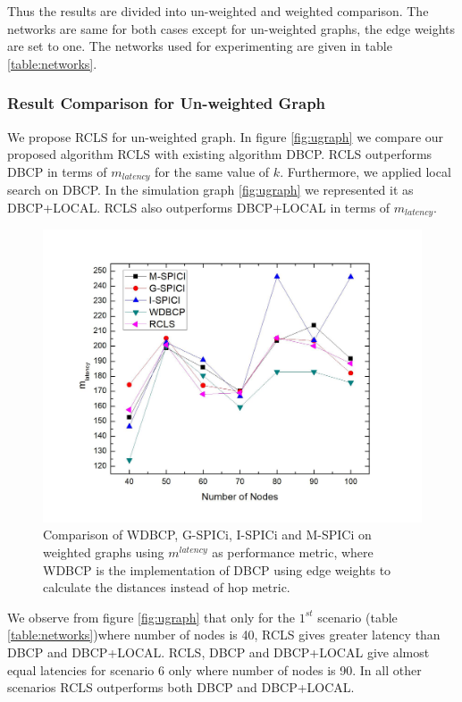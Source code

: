 \documentclass[a4paper,twocolumn,preprint]{elsarticle}
\begin{document}
Thus the results are divided into un-weighted and weighted comparison. The networks are same for both cases except for un-weighted graphs, the edge weights are set to one. The networks used for experimenting are given in table \ref{table:networks}.


\subsubsection{Result Comparison for Un-weighted Graph}
We propose RCLS for un-weighted graph. In figure \ref{fig:ugraph} we compare our proposed algorithm RCLS with existing algorithm DBCP. RCLS outperforms DBCP in terms of $m_{latency}$ for the same value of $k$. Furthermore, we applied local search on DBCP. In the simulation graph \ref{fig:ugraph} we represented it as DBCP+LOCAL. RCLS also outperforms DBCP+LOCAL in terms of $m_{latency}$.
		
\begin{figure}
	\includegraphics[width=\linewidth]{wgraph.jpg}
	\caption{Comparison of WDBCP, G-SPICi, I-SPICi and M-SPICi on weighted graphs using $m^{latency}$ as performance metric, where WDBCP is the implementation of DBCP using edge weights to calculate the distances instead of hop metric.}
	\label{fig:wgraph}
\end{figure}


We observe from figure \ref{fig:ugraph} that only for the $1^{st}$ scenario (table \ref{table:networks})where number of nodes is 40, RCLS gives greater latency than DBCP and DBCP+LOCAL. RCLS, DBCP and DBCP+LOCAL give almost equal latencies for scenario 6 only where number of nodes is 90. In all other scenarios RCLS outperforms both DBCP and DBCP+LOCAL.
\end{document}

